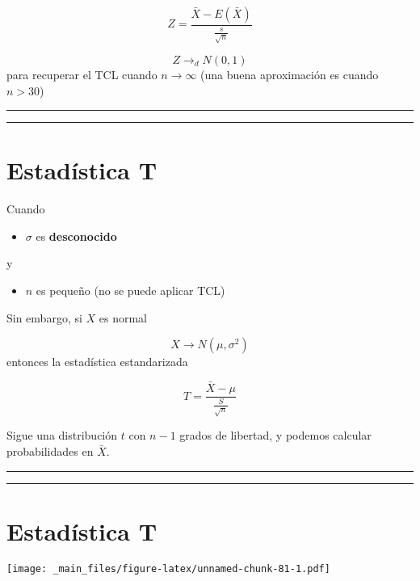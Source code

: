 \documentclass[
]{book}
\providecommand{\tightlist}{%
  \setlength{\itemsep}{0pt}\setlength{\parskip}{0pt}}
\begin{document}
\[Z=\frac{\bar{X}-E(\bar{X})}{\frac{s}{\sqrt{n}}} \]

\[Z \rightarrow_d N(0,1)\] para recuperar el TCL cuando \(n\rightarrow \infty\) (una buena aproximación es cuando \(n>30\))

\begin{center}\rule{0.5\linewidth}{0.5pt}\end{center}

\begin{center}\rule{0.5\linewidth}{0.5pt}\end{center}

\hypertarget{estaduxedstica-t}{%
\section{Estadística T}\label{estaduxedstica-t}}

Cuando

\begin{itemize}
\tightlist
\item
  \(\sigma\) es \textbf{desconocido}
\end{itemize}

y

\begin{itemize}
\tightlist
\item
  \(n\) es pequeño (no se puede aplicar TCL)
\end{itemize}

Sin embargo, si \(X\) es normal

\[X \rightarrow N(\mu, \sigma^2)\] entonces la estadística estandarizada

\[T=\frac{\bar{X}-\mu}{\frac{S}{\sqrt{n}}} \]

Sigue una distribución \(t\) con \(n-1\) grados de libertad, y podemos calcular probabilidades en \(\bar{X}\).

\begin{center}\rule{0.5\linewidth}{0.5pt}\end{center}

\begin{center}\rule{0.5\linewidth}{0.5pt}\end{center}

\hypertarget{estaduxedstica-t-1}{%
\section{Estadística T}\label{estaduxedstica-t-1}}

\texttt{[image: \_main\_files/figure-latex/unnamed-chunk-81-1.pdf]}
\end{document}

